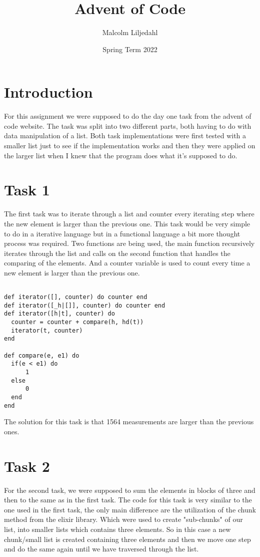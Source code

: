 \documentclass[a4paper,11pt]{article}
\begin{document}
\title{
    \textbf{Advent of Code}
}
\author{Malcolm Liljedahl}
\date{Spring Term 2022}

\maketitle

\section*{Introduction}
For this assignment we were supposed to do the day one task from the advent of code website. The task was split into two different parts, both having to do with data manipulation of a list. Both task implementations were first tested with a smaller list just to see if the implementation works and then they were applied on the larger list when I knew that the program does what it's supposed to do.

\section{Task 1}
The first task was to iterate through a list and counter every iterating step where the new element is larger than the previous one. This task would be very simple to do in a iterative language but in a functional language a bit more thought process was required. Two functions are being used, the main function recursively iterates through the list and calls on the second function that handles the comparing of the elements. And a counter variable is used to count every time a new element is larger than the previous one.

\begin{verbatim}

def iterator([], counter) do counter end
def iterator([_h|[]], counter) do counter end
def iterator([h|t], counter) do
  counter = counter + compare(h, hd(t))
  iterator(t, counter)
end

def compare(e, e1) do
  if(e < e1) do
      1
  else
      0
  end
end

\end{verbatim}

The solution for this task is that 1564 measurements are larger than the previous ones.


\section{Task 2}
For the second task, we were supposed to sum the elements in blocks of three and then to the same as in the first task. The code for this task is very similar to the one used in the first task, the only main difference are the utilization of the chunk method from the elixir library. Which were used to create "sub-chunks" of our list, into smaller lists which contains three elements. So in this case a new chunk/small list is created containing three elements and then we move one step and do the same again until we have traversed through the list.
\end{document}
